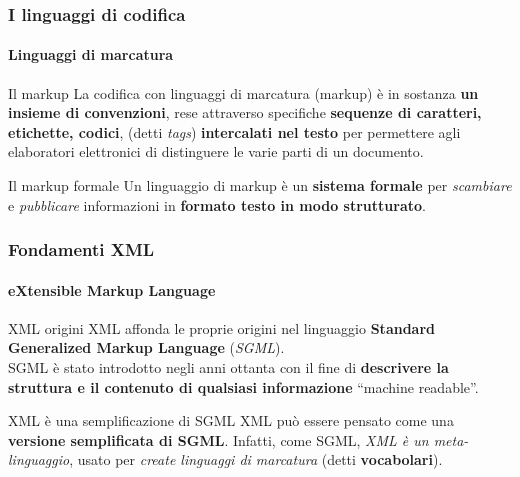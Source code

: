 \begin{frame}
	\frametitle{I linguaggi di codifica}
	\framesubtitle{Linguaggi di marcatura}
	\addtocounter{nframe}{1}

	\begin{block}{Il markup}
		La codifica con linguaggi di marcatura (markup) è in sostanza \textbf{un insieme di convenzioni}, rese attraverso specifiche \textbf{sequenze di caratteri, etichette, codici}, (detti \textit{tags}) \textbf{intercalati nel testo} per permettere agli elaboratori elettronici di distinguere le varie parti di un documento.
	\end{block}

	\begin{block}{Il markup formale}
		Un linguaggio di markup è un \textbf{sistema formale} per \textit{scambiare} e \textit{pubblicare} informazioni in \textbf{formato testo in modo strutturato}.
	\end{block}


\end{frame}




\begin{frame}
	\frametitle{Fondamenti XML}
	\framesubtitle{eXtensible Markup Language}
	\addtocounter{nframe}{1}

	\begin{block}{XML origini}
		XML affonda le proprie origini nel linguaggio \textbf{Standard Generalized Markup Language} (\textit{SGML}).
		\\ SGML è stato introdotto negli anni ottanta con il fine di \textbf{descrivere la struttura e il contenuto di qualsiasi informazione} ``machine readable''.
	\end{block}

	\begin{block} {XML è una semplificazione di SGML}
		XML può essere pensato come una \textbf{versione semplificata di SGML}. Infatti, come SGML, \textit{XML è un meta-linguaggio}, usato per \textit{create linguaggi di marcatura} (detti \textbf{vocabolari}).
	\end{block}
\end{frame}

